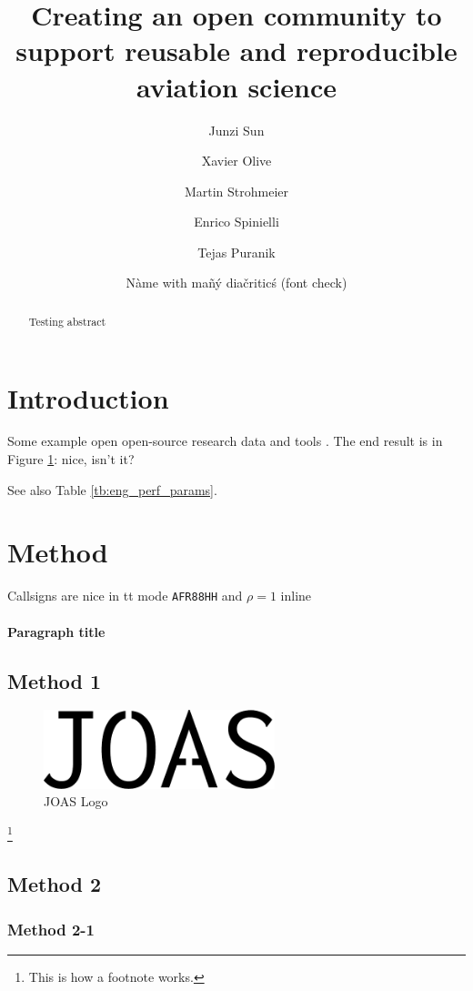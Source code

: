 \documentclass[
  manuscript=article,  %
  layout=preprint,  %
  year=20xx,
  volume=x,
]{extra/joas}
\title{Creating an open community to support reusable and reproducible aviation science}
\author{Junzi Sun}
\affiliation{Joint first authors}
\author{Xavier Olive}
\affiliation{Joint first authors}
\author{Martin Strohmeier}
\affiliation{OpenSky Network, Switzerland}
\author{Enrico Spinielli}
\affiliation{EUROCONTROL, Belgium}
\author{Tejas Puranik}
\affiliation{NASA Ames Research Center, USA}
\author{Nàme with mañý diačriticś (font check)}
\affiliation{University of Syldavia}
\begin{document}
\begin{abstract}
  Testing abstract \blindtext 
\end{abstract}


\section{Introduction}

\blindtext Some example open open-source research data \cite{schafer2014bringing} and tools \cite{olive2019traffic,sun2020openap}. The end result is in Figure \ref{fig:logo}: nice, isn't it?


\blindtext[2]

\blindtext See also Table \ref{tb:eng_perf_params}.


\section{Method}

Callsigns are nice in tt mode \texttt{AFR88HH} and $\rho = 1$ inline

\paragraph{Paragraph title} \blindtext

\subsection{Method 1}

\blindtext

\begin{figure}[ht!]
  \centering
  \includegraphics[width=0.6\textwidth]{figures/joas-logo.pdf}
  \caption{JOAS Logo}
  \label{fig:logo}
\end{figure}

\blindtext\footnote{This is how a footnote works.}

\subsection{Method 2}

\subsubsection{Method 2-1}
\end{document}
